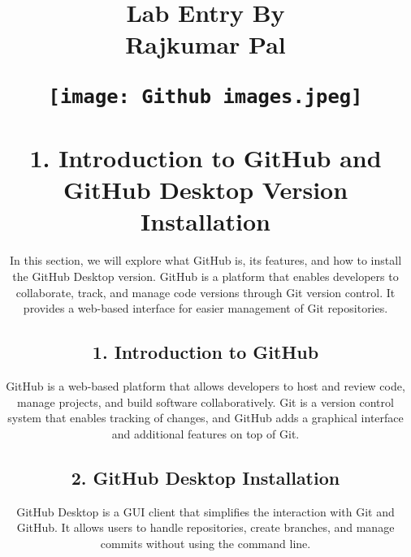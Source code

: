 \documentclass[a4paper,12pt]{article}
\begin{document}
\newpage
\usetikzlibrary{calc}

\title{Lab Entry By\\[0.5cm] \large Rajkumar Pal\\[0.5cm]
    \begin{figure}
    \centering
    \texttt{[image: Github images.jpeg]} %
\end{figure}
\author{}
\date{}

\maketitle
\section*{1. Introduction to GitHub and GitHub Desktop Version Installation}

In this section, we will explore what GitHub is, its features, and how to install the GitHub Desktop version. GitHub is a platform that enables developers to collaborate, track, and manage code versions through Git version control. It provides a web-based interface for easier management of Git repositories.

\subsection*{1. Introduction to GitHub}
GitHub is a web-based platform that allows developers to host and review code, manage projects, and build software collaboratively. Git is a version control system that enables tracking of changes, and GitHub adds a graphical interface and additional features on top of Git.

\subsection*{2. GitHub Desktop Installation}
GitHub Desktop is a GUI client that simplifies the interaction with Git and GitHub. It allows users to handle repositories, create branches, and manage commits without using the command line.

}
\end{document}

